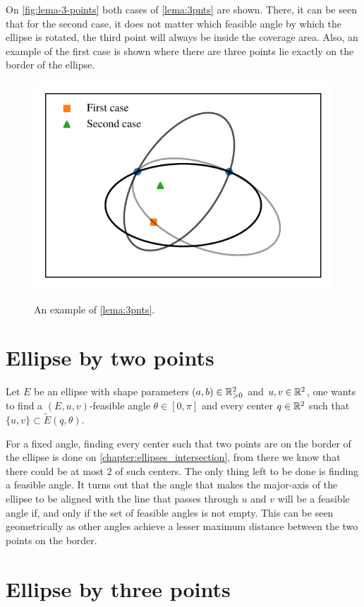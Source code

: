 On \autoref{fig:lema-3-points} both cases of \autoref{lema:3pnts} are shown. There, it can be seen that for the second case, it does not matter which feasible angle by which the ellipse is rotated, the third point will always be inside the coverage area. Also, an example of the first case is shown where there are three points lie exactly on the border of the ellipse.

\begin{figure}[H]
	\centering
	\caption{An example of \autoref{lema:3pnts}.}
	\includegraphics[scale=.8]{tex/figures/scripts/lema-3-points}
	\fautor
	\label{fig:lema-3-points}
\end{figure}


\section{Ellipse by two points}

Let $E$ be an ellipse with shape parameters $(a, b)\in \mathbb{R}^2_{>0}$ and $u, v\in \mathbb{R}^2$, one wants to find a $(E, u, v)$-feasible angle $\theta\in[0,\pi]$ and every center $q\in\mathbb{R}^2$ such that $\{u, v\} \subset \tilde{E}(q, \theta)$.

For a fixed angle, finding every center such that two points are on the border of the ellipse is done on \autoref{chapter:ellipses_intersection}, from there we know that there could be at most $2$ of such centers. The only thing left to be done is finding a feasible angle. It turns out that the angle that makes the major-axis of the ellipse to be aligned with the line that passes through $u$ and $v$ will be a feasible angle if, and only if the set of feasible angles is not empty. This can be seen geometrically as other angles achieve a lesser maximum distance between the two points on the border.

\section{Ellipse by three points}



